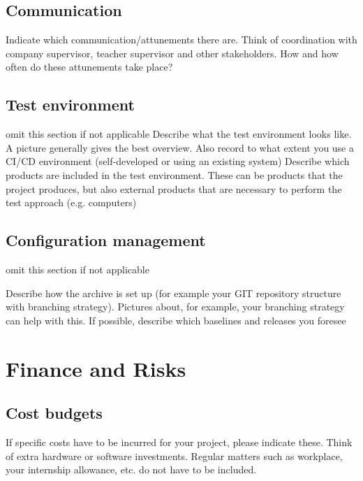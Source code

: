 \documentclass[a4paper, 11pt]{article}
\begin{document}
  \subsection{Communication}
  Indicate which communication/attunements there are. Think of coordination with company supervisor, teacher supervisor and other stakeholders. How and how often do these attunements take place?
  \subsection{Test environment}
  omit this section if not applicable
  \smallbreak
  Describe what the test environment looks like. A picture generally gives the best overview. Also record to what extent you use a CI/CD environment (self-developed or using an existing system)
  \smallbreak
  Describe which products are included in the test environment. These can be products that the project produces, but also external products that are necessary to perform the test approach (e.g. computers)
  \subsection{Configuration management}
  omit this section if not applicable

  \smallbreak
  Describe how the archive is set up (for example your GIT repository structure with branching strategy). Pictures about, for example, your branching strategy can help with this. If possible, describe which baselines and releases you foresee



\section{Finance and Risks}
\subsection{Cost budgets}
If specific costs have to be incurred for your project, please indicate these. Think of extra hardware or software investments. Regular matters such as workplace, your internship allowance, etc. do not have to be included.
\end{document}
